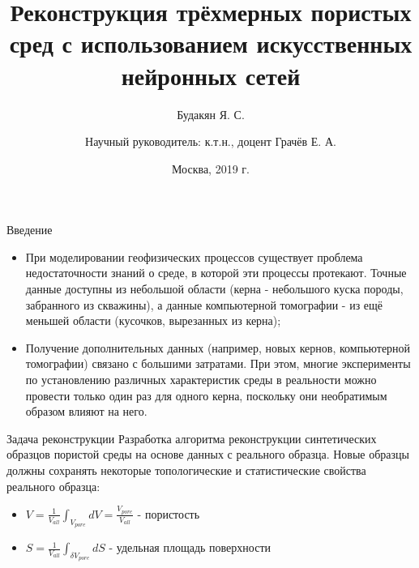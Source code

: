 \documentclass[12pt]{beamer}
\begin{document}
	\title{Реконструкция трёхмерных пористых сред с использованием искусственных нейронных сетей}
	\author{Будакян Я. С. \and \break \break \break Научный руководитель: к.т.н., доцент Грачёв Е. А.}
	\date{Москва, 2019 г.} 

	\maketitle

	\begin{frame}{Введение}
		\begin{itemize}
			\item При моделировании геофизических процессов существует проблема недостаточности знаний о среде, в которой эти процессы протекают. Точные данные доступны из небольшой области (керна - небольшого куска породы, забранного из скважины), а данные компьютерной томографии - из ещё меньшей области (кусочков, вырезанных из керна);
			
			\item Получение дополнительных данных (например, новых кернов, компьютерной томографии) связано с большими затратами. При этом, многие эксперименты по установлению различных характеристик среды в реальности можно провести только один раз для одного керна, поскольку они необратимым образом влияют на него.
		\end{itemize}
	\end{frame}

	\begin{frame}{Задача реконструкции}
		Разработка алгоритма реконструкции синтетических образцов пористой среды на основе данных с реального образца. Новые образцы должны сохранять некоторые топологические и статистические свойства реального образца:
		\begin{itemize}
			\item $ \displaystyle V = \frac{1}{V_{all}} \int_{V_{pore}} dV = \frac{V_{pore}}{V_{all}}$ - пористость
			\item $ \displaystyle S = \frac{1}{V_{all}} \int_{\delta V_{pore}} dS $ - удельная площадь поверхности
		\end{itemize}
		
	\end{frame}
\end{document}
